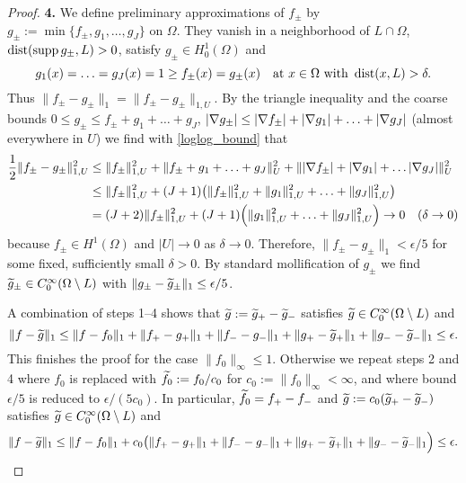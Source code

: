 \documentclass[11pt]{article}
\begin{document}
\begin{proof}
{\bf 4.} We define preliminary approximations of $f_\pm$ by
$g_\pm:=\min\{f_\pm,g_1,\ldots,g_J\}$ on $\Omega$.
They vanish in a neighborhood of $L\cap\Omega$, $\operatorname{dist}(\operatorname{supp} g_\pm, L)>0$,
satisfy $g_\pm\in H^1_0(\Omega)$ and
\[
   g_1(x)=\ldots=g_J(x)=1\ge f_\pm(x)=g_\pm(x)\quad
   \text{at}\ x\in\Omega\ \text{with}\ \operatorname{dist}(x,L)>\delta.
\]
Thus
\(
   \|f_\pm-g_\pm\|_1 = \|f_\pm-g_\pm\|_{1,U}.
\)
%
By the triangle inequality and the coarse bounds
$0\le g_\pm\le f_\pm+g_1+\ldots+g_J$,
$|\nabla g_\pm|\le |\nabla f_\pm| + |\nabla g_1| + \ldots + |\nabla g_J|$
(almost everywhere in $U$) we find with \eqref{loglog_bound} that
\begin{align*}
   \frac 12 \|f_\pm-g_\pm\|_{1,U}^2
   &\le \|f_\pm\|_{1,U}^2 + \|f_\pm+g_1+\ldots+g_J\|_U^2
                                 + \||\nabla f_\pm| + |\nabla g_1| + \ldots |\nabla g_J|\|_U^2\\
   &\le \|f_\pm\|_{1,U}^2
            + (J+1)\bigl(\|f_\pm\|_{1,U}^2 + \|g_1\|_{1,U}^2 +\ldots+ \|g_J\|_{1,U}^2\bigr)\\
   &= (J+2)\|f_\pm\|_{1,U}^2 + (J+1)\Bigl(\|g_1\|_{1,U}^2 + \ldots + \|g_J\|_{1,U}^2\Bigr)
   \to 0\quad (\delta\to 0)
\end{align*}
because $f_\pm\in H^1(\Omega)$ and $|U|\to 0$ as $\delta\to 0$.
Therefore, $\|f_\pm-g_\pm\|_1<\epsilon/5$ for some fixed, sufficiently small $\delta>0$.
By standard mollification of $g_\pm$ we find $\widetilde g_\pm\in C^\infty_0(\Omega\setminus L)$ with
$\|g_\pm-\widetilde g_\pm\|_1\le \epsilon/5$.

\medskip
A combination of steps 1--4 shows that $\widetilde g:=\widetilde g_+-\widetilde g_-$ satisfies
$\widetilde g\in C^\infty_0(\Omega\setminus L)$ and
\[
   \|f-\widetilde g\|_1
   \le
   \|f-f_0\|_1 + \|f_+ -g_+\|_1 + \|f_- - g_-\|_1 + \|g_+-\widetilde g_+\|_1 + \|g_--\widetilde g_-\|_1
   \le \epsilon.
\]
This finishes the proof for the case $\|f_0\|_\infty\le 1$.
Otherwise we repeat steps 2 and 4 where $f_0$ is replaced with
$\widetilde f_0:=f_0/c_0$ for $c_0:=\|f_0\|_\infty<\infty$,
and where bound $\epsilon/5$ is reduced to $\epsilon/(5c_0)$.
In particular, $\widetilde f_0=f_+-f_-$ and $\widetilde g:=c_0(\widetilde g_+-\widetilde g_-)$ satisfies
$\widetilde g\in C^\infty_0(\Omega\setminus L)$ and
\[
   \|f-\widetilde g\|_1
   \le
   \|f-f_0\|_1
   + c_0
   \bigl(\|f_+ -g_+\|_1 + \|f_- - g_-\|_1 + \|g_+-\widetilde g_+\|_1 + \|g_--\widetilde g_-\|_1\Bigr)
   \le \epsilon.
\]
\end{proof}
\end{document}
